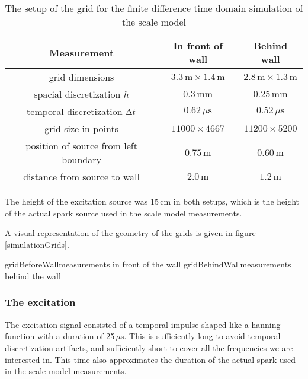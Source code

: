 \begin{table}[htb]
\begin{center}
\caption{The setup of the grid for the finite difference time domain simulation of the scale model\label{gridSetup}}
\begin{tabular}{c|c|c}
Measurement&	In front of wall&	Behind wall\\\hline
grid dimensions&
	$3.3\,\mathrm{m} \times 1.4\,\mathrm{m}$&
	$2.8\,\mathrm{m} \times 1.3\,\mathrm{m}$\\
spacial discretization $h$&
	$0.3\,\mathrm{mm}$&
	$0.25\,\mathrm{mm}$\\
temporal discretization $\Delta t$&
	$0.62\,\mu\mathrm{s}$&
	$0.52\,\mu\mathrm{s}$\\
grid size in points&
	$11000 \times 4667$&
	$11200 \times 5200$\\
position of source from left boundary&
	$0.75\,\mathrm{m}$&
	$0.60\,\mathrm{m}$\\
distance from source to wall&
	$2.0\,\mathrm{m}$&
	$1.2\,\mathrm{m}$\\
\end{tabular}
\end{center}
\end{table}

The height of the excitation source was 15\,cm in both setups, which is the height of the actual spark source used in the scale model measurements.

A visual representation of the geometry of the grids is given in figure \ref{simulationGrids}.

	{gridBeforeWall}{measurements in front of the wall}
	{gridBehindWall}{measurements behind the wall}




\subsubsection*{The excitation}
The excitation signal consisted of a temporal impulse shaped like a hanning function with a duration of 25\,$\mu$s. This is sufficiently long to avoid temporal discretization artifacts, and sufficiently short to cover all the frequencies we are interested in. This time also approximates the duration of the actual spark used in the scale model measurements.

